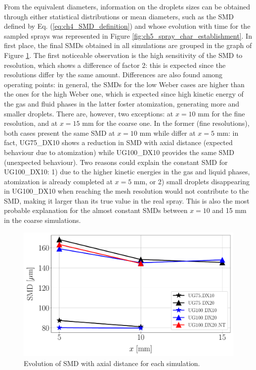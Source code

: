 From the equivalent diameters, information on the droplets sizes can be obtained through either statistical distributions or mean diameters, such as the SMD defined by Eq. (\ref{eq:ch4_SMD_definition}) and whose evolution with time for the sampled sprays was represented in Figure \ref{fig:ch5_spray_char_establishment}. In first place, the final SMDs obtained in all simulations are grouped in the graph of Figure \ref{fig:ch5_spray_char_SMD_final}. The first noticeable observation is the high sensitivity of the SMD to resolution, which shows a difference of factor 2: this is expected since the resolutions differ by the same amount. Differences are also found among operating points: in general, the SMDs for the low Weber cases are higher than the ones for the high Weber one, which is expected since high kinetic energy of the gas and fluid phases in the latter foster atomization, generating more and smaller droplets. There are, however, two exceptions: at $x = 10$ mm for the fine resolution, and at $x = 15$ mm for the coarse one. In the former (fine resolutions), both cases present the same SMD at $x = 10$ mm while differ at $x = 5$ mm: in fact, UG75\_DX10 shows a reduction in SMD with axial distance (expected behaviour due to atomization) while UG100\_DX10 provides the same SMD (unexpected behaviour). Two reasons could explain the constant SMD for UG100\_DX10: 1) due to the higher kinetic energies in the gas and liquid phases, atomization is already completed at $x = 5$ mm, or 2) small droplets disappearing in UG100\_DX10 when reaching the mesh resolution would not contribute to the SMD, making it larger than its true value in the real spray. This is also the most probable explanation for the almost constant SMDs between $x = 10$ and 15 mm in the coarse simulations.

\begin{figure}[ht]
\centering
   \includegraphics[scale=0.30]{./part2_developments/figures_ch5_resolved_JICF/SPRAY_characterization/SMD_values}
   \vspace*{-0.15in}
   \caption{Evolution of SMD with axial distance for each simulation.}
   \label{fig:ch5_spray_char_SMD_final}
\end{figure}

